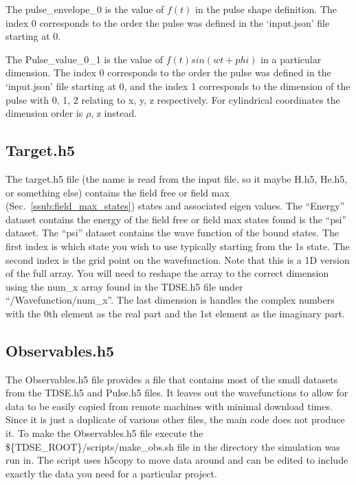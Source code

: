 \documentclass{article}
\begin{document}
The pulse\_envelope\_0 is the value of $f(t)$ in the pulse shape definition. The index 0 corresponds to the order the pulse was defined in the `input.json' file starting at 0.

The Pulse\_value\_0\_1 is the value of $f(t)sin(wt+phi)$ in a particular dimension. The index 0 corresponds to the order the pulse was defined in the `input.json' file starting at 0, and the index 1 corresponds to the dimension of the pulse with 0, 1, 2 relating to x, y, z respectively. For cylindrical coordinates the dimension order is $\rho$, z instead.

\subsection{Target.h5} %
\label{sub:target_h5}
The target.h5 file (the name is read from the input file, so it maybe H.h5, He.h5, or something else) contains the field free or field max (Sec.~\ref{ssub:field_max_states}) states and associated eigen values. The ``Energy'' dataset contains the energy of the field free or field max states found is the ``psi'' dataset. The ``psi'' dataset contains the wave function of the bound states. The first index is which state you wish to use typically starting from the 1s state. The second index is the grid point on the wavefunction. Note that this is a 1D version of the full array. You will need to reshape the array to the correct dimension using the num\_x array found in the TDSE.h5 file under ``/Wavefunction/num\_x''. The last dimension is handles the complex numbers with the 0th element as the real part and the 1st element as the imaginary part.

\subsection{Observables.h5} %
\label{sub:observables_h5}
The Observables.h5 file provides a file that contains most of the small datasets from the TDSE.h5 and Pulse.h5 files. It leaves out the wavefunctions to allow for data to be easily copied from remote machines with minimal download times. Since it is just a duplicate of various other files, the main code does not produce it. To make the Observables.h5 file execute the \$\{TDSE\_ROOT\}/scripts/make\_obs.sh file in the directory the simulation was run in. The script uses h5copy to move data around and can be edited to include exactly the data you need for a particular project.
\end{document}

